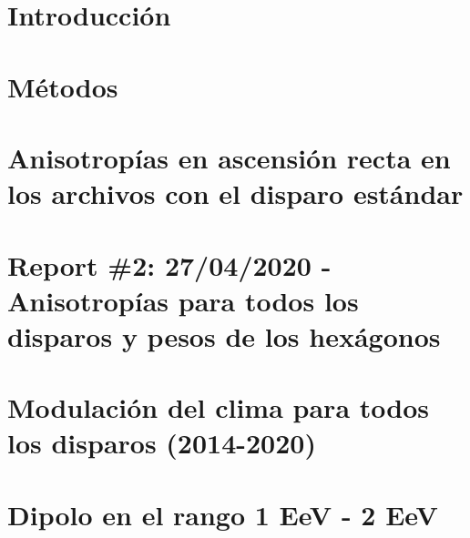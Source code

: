 \documentclass{ibtesis}
\begin{document}
\chapter{Introducción}
\graphicspath{{0_Introduccion/}}



\chapter{Métodos}
\graphicspath{{1_Metodo/}}



\chapter{Anisotropías en ascensión recta en los archivos con el disparo estándar}
\graphicspath{{0_Introduccion/}}



\chapter{Report \#2: 27/04/2020 - Anisotropías para todos los disparos y pesos de los hexágonos}
\graphicspath{{report_2_27_04_2020/}}



\chapter{Modulación del clima para todos los disparos (2014-2020)}
\graphicspath{{4_Weather_Modulation/}}



\chapter{Dipolo en el rango 1 EeV - 2 EeV}
\graphicspath{{6_Dipole_1-2_EeV/}}



\begin{biblio}
	
\end{biblio}
\end{document}
